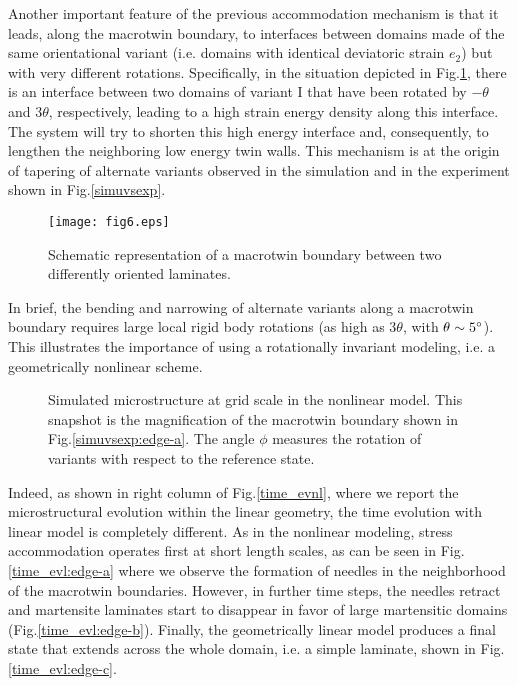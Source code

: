 \documentclass[twocolumn,amsmath,amssymb]{revtex4}
\begin{document}
Another important feature of the previous accommodation mechanism is that it leads, along the macrotwin boundary, to interfaces between domains made of the same orientational variant (i.e. domains with identical deviatoric strain $e_2$) but with very different rotations. Specifically, in the situation depicted in Fig.\ref{macrotwin_sketch}, there is an interface between two domains of variant I that have been rotated by $-\theta$ and $3\theta$, respectively, leading to a high strain energy density along this interface. The system will try to shorten this high energy interface and, consequently, to lengthen the neighboring low energy twin walls. This mechanism is at the origin of tapering of alternate variants observed in the simulation and in the experiment shown in Fig.\ref{simuvsexp}.
\begin{figure}
\hspace{3cm}
\begin{minipage}[t]{1\linewidth}
\texttt{[image: fig6.eps]}
\end{minipage}
\caption{\label{macrotwin_sketch} Schematic representation of a macrotwin boundary between two differently oriented laminates.} 
\end{figure}
%
In brief, the bending and narrowing of alternate variants along a macrotwin boundary requires large local rigid body rotations (as high as $3\theta$, with $\theta \sim 5\degree$). This illustrates the importance of using a rotationally invariant modeling, i.e. a geometrically nonlinear scheme.
\begin{figure}
\begin{center}
\caption{\label{rotations:edge-b} Simulated microstructure at grid scale in the nonlinear model. This snapshot is the magnification of the macrotwin boundary shown in Fig.\ref{simuvsexp:edge-a}. The angle $\phi$ measures the rotation of variants with respect to the reference state.  }
\end{center}
\end{figure}
Indeed, as shown in right column of Fig.\ref{time_evnl}, where we report the microstructural evolution within  the linear geometry, the time evolution with linear model is completely different. As in the nonlinear modeling, stress accommodation operates first at short length scales, as can be seen in Fig.\ref{time_evl:edge-a} where we observe the formation of needles in the neighborhood of the macrotwin boundaries. However, in further time steps,  the needles retract and martensite laminates start to disappear in favor of large martensitic domains (Fig.\ref{time_evl:edge-b}). Finally, the geometrically linear model produces a final state that extends across the whole domain, i.e. a simple laminate, shown in Fig.\ref{time_evl:edge-c}. 
\end{document}
